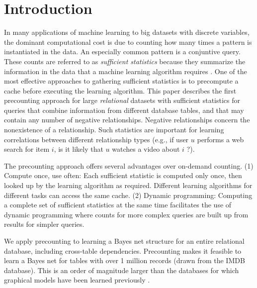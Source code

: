 \documentclass{vldb}
\begin{document}
\section{Introduction} 
In many applications of machine learning to big datasets with discrete variables, the dominant computational cost is due to counting how many times a pattern is instantiated in the data. An especially common pattern is a conjuntive query.
These counts are referred to as {\em sufficient statistics} because they summarize the information in the data that a machine learning algorithm requires \cite{Moore1998}. 
One of the most effective approaches to gathering sufficient statistics is to precompute a cache  before executing the learning algorithm. This paper describes the first precounting approach for large {\em relational} datasets with sufficient statistics for queries that combine information from different database tables, and that may contain any number of negative relationships. Negative relationships concern the nonexistence of a relationship. Such statistics are important for learning correlations between different relationship types (e.g., if user $u$ performs a web search for item $i$, is it likely that $u$ watches a video about $i$ ?). 

The precounting approach offers several advantages over on-demand counting. (1) Compute once, use often: Each sufficient statistic is computed only once, then looked up by the learning algorithm as required. Different learning algorithms for different tasks can access the same cache.
(2) Dynamic programming: Computing a complete set of sufficient statistics at the same time facilitates the use of dynamic programming where  counts for more complex queries are built up from results for simpler queries. 

We apply precounting to learning a Bayes net structure for an entire relational database, including cross-table dependencies. 
Precounting makes it feasible to learn a Bayes net for tables with over 1 million records (drawn from the IMDB database). This is an order of magnitude larger than the databases for which graphical models  have been learned previously \cite{Schulte2012,Khot2011}.
\end{document}
